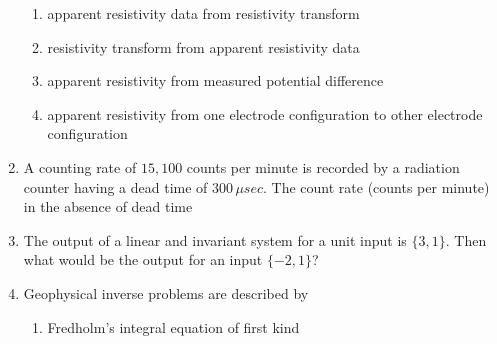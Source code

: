 \documentclass[12pt,fleqn]{article}
\theoremstyle{remark}
\begin{document}
\begin{enumerate}[label=Q.\arabic*.,font=\bfseries, start = 21]
            \begin{enumerate}
                \item apparent resistivity data from resistivity transform
                \item resistivity transform from apparent resistivity data
                \item apparent resistivity from measured potential difference
                \item apparent resistivity from one electrode configuration to other electrode configuration                
            \end{enumerate}
    \item A counting rate of $15,100$ counts per minute is recorded by a radiation counter having a dead time of $300\,\mu sec$. The count rate (counts per minute) in the absence of dead time \hfill{} 
            \begin {enumerate}
            \end{enumerate}
     \item The output of a linear and invariant system for a unit input is $\{ 3,1\}$. Then what would be the output for an input $\{-2, 1\}$? \hfill{} 
            \begin {enumerate}
            \end{enumerate}
    \item Geophysical inverse problems are described by \hfill{} 
            \begin{enumerate}
                \item Fredholm's integral equation of first kind

\end{enumerate}
\end{enumerate}
\end{document}
